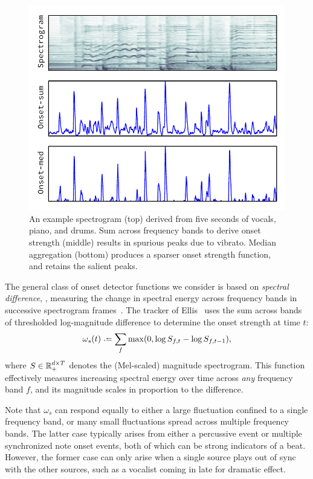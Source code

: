 \documentclass{article}
\begin{document}
\begin{figure}
\centering%
\includegraphics[width=\columnwidth]{figs/onsets}%
\vspace{-\baselineskip}%
\caption{An example spectrogram (top) derived from five seconds of vocals, piano, and drums.  
Sum across frequency bands to derive onset strength (middle) results in spurious peaks due to vibrato.
Median aggregation (bottom) produces a sparser onset strength function, and retains the salient peaks.}
\label{fig:onsets}
\end{figure}

The general class of onset detector functions we consider is based on \emph{spectral 
difference}, \ie, measuring the change in spectral energy across frequency bands in 
successive spectrogram frames~\cite{bello2005tutorial}. The tracker 
of Ellis~\cite{ellis2007beat} uses the sum across bands of thresholded log-magnitude
difference to determine the onset strength at time $t$:
\begin{equation}
\omega_s(t) \defeq \sum_f \max(0, \log S_{f, t} - \log S_{f, t-1}),\label{eq:onset:sum}
\end{equation}
where $S \in \mathbb{R}_+^{d\times T}$ denotes the (Mel-scaled) magnitude spectrogram.  
This function effectively measures increasing spectral energy over time across 
\emph{any} frequency band $f$, and its magnitude scales in proportion to the 
difference.

Note that $\omega_s$ can respond equally to either a large fluctuation confined to a 
single frequency band, or many small fluctuations spread across multiple frequency bands.
The latter case typically arises from either a percussive event or multiple synchronized 
note onset events, both of which can be strong indicators of a beat.  However, the former 
case can only arise when a single source plays out of sync with the other sources, such 
as a vocalist coming in late for dramatic effect.
\end{document}
